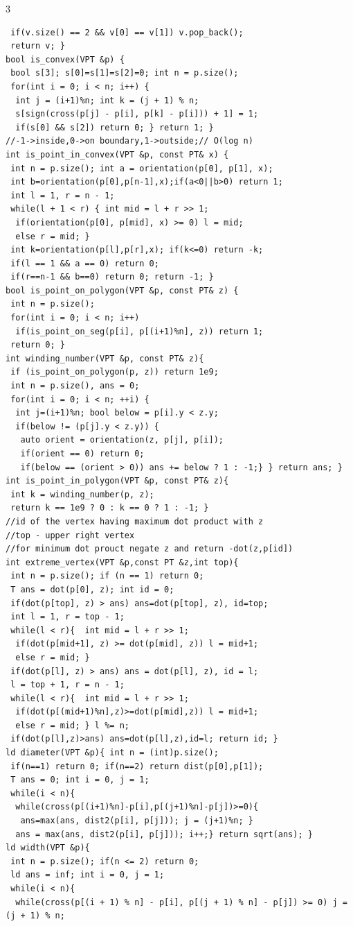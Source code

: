 \documentclass[8pt,a4paper,onesided]{article}
\begin{document}
\begin{multicols}{3}
\begin{verbatim}
 if(v.size() == 2 && v[0] == v[1]) v.pop_back();
 return v; }
bool is_convex(VPT &p) {
 bool s[3]; s[0]=s[1]=s[2]=0; int n = p.size();
 for(int i = 0; i < n; i++) {
  int j = (i+1)%n; int k = (j + 1) % n;
  s[sign(cross(p[j] - p[i], p[k] - p[i])) + 1] = 1;
  if(s[0] && s[2]) return 0; } return 1; }
//-1->inside,0->on boundary,1->outside;// O(log n)
int is_point_in_convex(VPT &p, const PT& x) {
 int n = p.size(); int a = orientation(p[0], p[1], x);
 int b=orientation(p[0],p[n-1],x);if(a<0||b>0) return 1;
 int l = 1, r = n - 1;
 while(l + 1 < r) { int mid = l + r >> 1;
  if(orientation(p[0], p[mid], x) >= 0) l = mid;
  else r = mid; }
 int k=orientation(p[l],p[r],x); if(k<=0) return -k;
 if(l == 1 && a == 0) return 0; 
 if(r==n-1 && b==0) return 0; return -1; }
bool is_point_on_polygon(VPT &p, const PT& z) {
 int n = p.size();
 for(int i = 0; i < n; i++)
  if(is_point_on_seg(p[i], p[(i+1)%n], z)) return 1;
 return 0; }
int winding_number(VPT &p, const PT& z){
 if (is_point_on_polygon(p, z)) return 1e9;
 int n = p.size(), ans = 0;
 for(int i = 0; i < n; ++i) {
  int j=(i+1)%n; bool below = p[i].y < z.y;
  if(below != (p[j].y < z.y)) {
   auto orient = orientation(z, p[j], p[i]);
   if(orient == 0) return 0;
   if(below == (orient > 0)) ans += below ? 1 : -1;} } return ans; }
int is_point_in_polygon(VPT &p, const PT& z){
 int k = winding_number(p, z);
 return k == 1e9 ? 0 : k == 0 ? 1 : -1; }
//id of the vertex having maximum dot product with z
//top - upper right vertex
//for minimum dot prouct negate z and return -dot(z,p[id])
int extreme_vertex(VPT &p,const PT &z,int top){
 int n = p.size(); if (n == 1) return 0;
 T ans = dot(p[0], z); int id = 0;
 if(dot(p[top], z) > ans) ans=dot(p[top], z), id=top;
 int l = 1, r = top - 1;
 while(l < r){  int mid = l + r >> 1;
  if(dot(p[mid+1], z) >= dot(p[mid], z)) l = mid+1;
  else r = mid; }
 if(dot(p[l], z) > ans) ans = dot(p[l], z), id = l;
 l = top + 1, r = n - 1;
 while(l < r){  int mid = l + r >> 1;
  if(dot(p[(mid+1)%n],z)>=dot(p[mid],z)) l = mid+1;
  else r = mid; } l %= n;
 if(dot(p[l],z)>ans) ans=dot(p[l],z),id=l; return id; }
ld diameter(VPT &p){ int n = (int)p.size();
 if(n==1) return 0; if(n==2) return dist(p[0],p[1]);
 T ans = 0; int i = 0, j = 1;
 while(i < n){
  while(cross(p[(i+1)%n]-p[i],p[(j+1)%n]-p[j])>=0){
   ans=max(ans, dist2(p[i], p[j])); j = (j+1)%n; }
  ans = max(ans, dist2(p[i], p[j])); i++;} return sqrt(ans); }
ld width(VPT &p){
 int n = p.size(); if(n <= 2) return 0;
 ld ans = inf; int i = 0, j = 1;
 while(i < n){
  while(cross(p[(i + 1) % n] - p[i], p[(j + 1) % n] - p[j]) >= 0) j = (j + 1) % n;

\end{verbatim}
\end{multicols}
\end{document}
